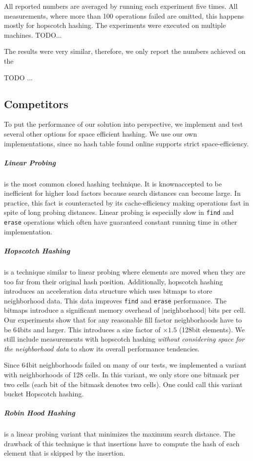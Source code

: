 \documentclass[a4paper,UKenglish]{lipics-v2016}
\begin{document}
All reported numbers are averaged by running each experiment five
times.  All measurements, where more than 100 operations failed are
omitted, this happens mostly for hopscotch hashing.  The experiments
were executed on multiple machines.
TODO...

The results were very similar, therefore, we only report the numbers
achieved on the

TODO
...


\subsection*{Competitors}
\label{sec:exp_competitors}
To put the performance of our solution into perspective, we
implement and test several other options for space efficient
hashing.  We use our own implementations, since no hash table found
online supports strict space-efficiency.

\subparagraph*{Linear Probing} is the most common closed hashing
technique.  It is knownaccepted to be inefficient for higher load
factors because search distances can become large.  In practice, this
fact is counteracted by its cache-efficiency making operations fast in
spite of long probing distances.  Linear probing is especially slow in
\verb~find~ and \verb~erase~ operations which often have guaranteed
constant running time in other implementation.

\subparagraph*{Hopscotch Hashing} is a technique similar to linear probing where
elements are moved when they are too far from their original hash
position.  Additionally, hopscotch hashing introduces an acceleration
data structure which uses bitmaps to store neighborhood data. This
data improves \verb~find~ and \verb~erase~ performance.  The
bitmaps introduce a significant memory overhead of $|$neighborhood$|$
bits per cell.  Our experiments show that for any reasonable fill
factor neighborhoods have to be 64bits and larger.  This introduces a
size factor of $\times1.5$ (128bit elements).  We still include
measurements with hopscotch hashing \emph{without considering space for
the neighborhood data} to show its overall performance tendencies.

Since 64bit neighborhoods failed on many of our tests, we implemented
a variant with neighborhoods of 128 cells.  In this variant, we only
store one bitmask per two cells (each bit of the bitmask denotes two
cells). One could call this variant bucket Hopscotch hashing.

\subparagraph*{Robin Hood Hashing} is a linear probing variant that
minimizes the maximum search distance.  The drawback of this technique
is that insertions have to compute the hash of each element that is
skipped by the insertion.
\end{document}
